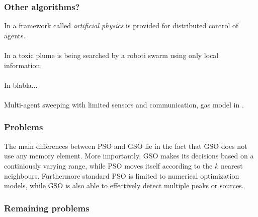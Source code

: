 \subsubsection{Other algorithms?}
	In \cite{zarzhitsky2005agent} a framework called \emph{artificial physics} is provided for distributed control of agents.\\
	\\
	In \cite{zarzhitsky2005distributed} a toxic plume is being searched by a roboti swarm using only local information. \\
	\\
	In \cite{shen2004hormone} blabla...\\
	\\
	Multi-agent sweeping with limited sensors and communication, gas model in \cite{kerr2005two}.

	\subsubsection{Problems}
	The main differences between PSO and GSO lie in the fact that GSO does not use any memory element. More importantly, GSO makes its decisions based on a continiously varying range, while PSO moves itself according to the $k$ nearest neighbours. Furthermore standard PSO is limited to numerical optimization models, while GSO is also able to effectively detect multiple peaks or sources.

	\subsubsection{Remaining problems}